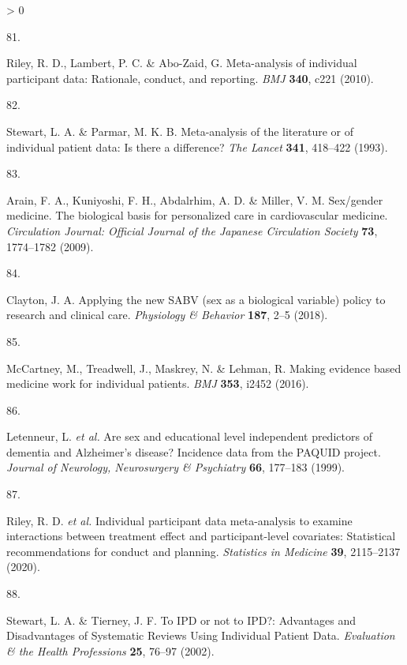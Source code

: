 \documentclass[a4paper, twoside]{templates/ociamthesis}
\newlength{\cslhangindent}
\newlength{\csllabelwidth}
\newenvironment{CSLReferences}[3] %
 {%
  \setlength{\parindent}{0pt}
  \ifodd #1 \everypar{\setlength{\hangindent}{\cslhangindent}}\ignorespaces\fi
  \ifnum #2 > 0
  \setlength{\parskip}{#2\baselineskip}
  \fi
 }%
 {}
\newcommand{\CSLLeftMargin}[1]{\parbox[t]{\maxof{\widthof{#1}}{\csllabelwidth}}{#1}}
\newcommand{\CSLRightInline}[1]{\parbox[t]{\linewidth - \csllabelwidth}{#1}}
\begin{document}
\begin{CSLReferences}{0}{0}
\leavevmode\hypertarget{ref-riley2010}{}%
\CSLLeftMargin{81. }
\CSLRightInline{Riley, R. D., Lambert, P. C. \& Abo-Zaid, G. Meta-analysis of individual participant data: Rationale, conduct, and reporting. \emph{BMJ} \textbf{340}, c221 (2010).}

\leavevmode\hypertarget{ref-stewart1993}{}%
\CSLLeftMargin{82. }
\CSLRightInline{Stewart, L. A. \& Parmar, M. K. B. Meta-analysis of the literature or of individual patient data: Is there a difference? \emph{The Lancet} \textbf{341}, 418--422 (1993).}

\leavevmode\hypertarget{ref-arain2009}{}%
\CSLLeftMargin{83. }
\CSLRightInline{Arain, F. A., Kuniyoshi, F. H., Abdalrhim, A. D. \& Miller, V. M. Sex/gender medicine. {The} biological basis for personalized care in cardiovascular medicine. \emph{Circulation Journal: Official Journal of the Japanese Circulation Society} \textbf{73}, 1774--1782 (2009).}

\leavevmode\hypertarget{ref-clayton2018}{}%
\CSLLeftMargin{84. }
\CSLRightInline{Clayton, J. A. Applying the new {SABV} (sex as a biological variable) policy to research and clinical care. \emph{Physiology \& Behavior} \textbf{187}, 2--5 (2018).}

\leavevmode\hypertarget{ref-mccartney2016}{}%
\CSLLeftMargin{85. }
\CSLRightInline{McCartney, M., Treadwell, J., Maskrey, N. \& Lehman, R. Making evidence based medicine work for individual patients. \emph{BMJ} \textbf{353}, i2452 (2016).}

\leavevmode\hypertarget{ref-letenneur1999}{}%
\CSLLeftMargin{86. }
\CSLRightInline{Letenneur, L. \emph{et al.} Are sex and educational level independent predictors of dementia and {Alzheimer}'s disease? {Incidence} data from the {PAQUID} project. \emph{Journal of Neurology, Neurosurgery \& Psychiatry} \textbf{66}, 177--183 (1999).}

\leavevmode\hypertarget{ref-riley2020}{}%
\CSLLeftMargin{87. }
\CSLRightInline{Riley, R. D. \emph{et al.} Individual participant data meta-analysis to examine interactions between treatment effect and participant-level covariates: {Statistical} recommendations for conduct and planning. \emph{Statistics in Medicine} \textbf{39}, 2115--2137 (2020).}

\leavevmode\hypertarget{ref-stewart2002}{}%
\CSLLeftMargin{88. }
\CSLRightInline{Stewart, L. A. \& Tierney, J. F. To {IPD} or not to {IPD}?: {Advantages} and {Disadvantages} of {Systematic Reviews Using Individual Patient Data}. \emph{Evaluation \& the Health Professions} \textbf{25}, 76--97 (2002).}


\end{CSLReferences}
\end{document}
